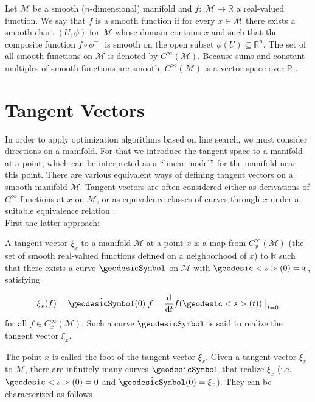 Let $\mathcal{M}$ be a smooth ($n$-dimensional) manifold and $f \colon \; \mathcal{M} \to \mathbb{R}$ a real-valued function. We say that $f$ is a smooth function if for every $x \in \mathcal{M}$ there exists a smooth chart $(U, \phi)$ for $\mathcal{M}$ whose domain contains $x$ and such that the composite function $f \circ \phi^{-1}$ is smooth on the open subset $\phi(U) \subseteq \mathbb{R}^n$. The set of all smooth functions on $\mathcal{M}$ is denoted by $C^{\infty}(\mathcal{M})$. Because sums and constant multiples of smooth functions are smooth, $C^{\infty}(\mathcal{M})$ is a vector space over $\mathbb{R}$ \cite[p.~32-33]{Lee:2003}. \\

\section{Tangent Vectors}

In order to apply optimization algorithms based on line search, we must consider directions on a manifold. For that we introduce the tangent space to a manifold at a point, which can be interpreted as a “linear model” for the manifold near this point. There are various equivalent ways of defining tangent vectors on a smooth manifold $\mathcal{M}$. Tangent vectors are often considered either as derivations of $C^{\infty}$-functions at $x$ on $\mathcal{M}$, or as equivalence classes of curves through $x$ under a suitable equivalence relation \cite[p.~15]{Lee:1997}. \\
First the latter approach:

\begin{definition}
    A tangent vector $\xi_x$ to a manifold $\mathcal{M}$ at a point $x$ is a map from $C^{\infty}_x(\mathcal{M})$ (the set of smooth real-valued functions defined on a neighborhood of $x$) to $\mathbb{R}$ such that there exists a curve $\geodesicSymbol$ on $\mathcal{M}$ with $\geodesic<s>(0) = x$, satisfying

    \begin{equation*}
        \xi_x (f) = \dot{\geodesicSymbol}(0) \; f = \frac{\mathrm{d}}{\mathrm{d}t} f(\geodesic<s>(t)) \; \big{\vert}_{t=0}
    \end{equation*}
    for all $f \in C^{\infty}_x(\mathcal{M})$. Such a curve $\geodesicSymbol$ is said to realize the tangent vector $\xi_x$.
\end{definition}

The point $x$ is called the foot of the tangent vector $\xi_x$. Given a tangent vector $\xi_x$ to $\mathcal{M}$, there are infinitely many curves $\geodesicSymbol$ that realize $\xi_x$ (i.e. $\geodesic<s>(0) = 0$ and $\dot{\geodesicSymbol}(0) = \xi_x$). They can be characterized as follows 

